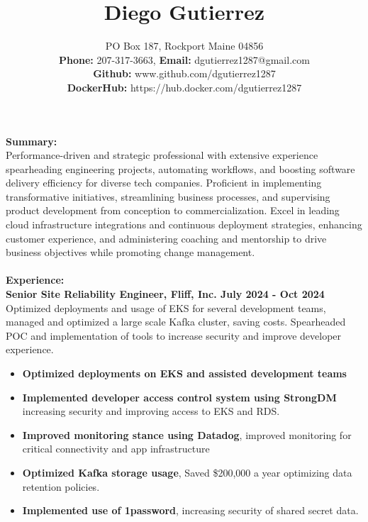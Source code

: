 \documentclass[10pt]{article}
\title{Diego Gutierrez}
\date{}
\author{%
	PO Box 187, Rockport Maine 04856\\
	\textbf{Phone:} 207-317-3663, \textbf{Email:} dgutierrez1287@gmail.com\\
	\textbf{Github:} www.github.com/dgutierrez1287\\
	\textbf{DockerHub:} https://hub.docker.com/dgutierrez1287
}
\makeatletter
\renewcommand{\maketitle}{\bgroup\setlength{\parindent}{0pt}
	\begin{flushleft}
		\LARGE\textbf{\@title}
		
		\normalsize\@author
	\end{flushleft}\egroup
}
\makeatother
\begin{document}
\maketitle
\thispagestyle{empty} %
\noindent\Large\textbf{Summary:}\\
\normalsize Performance-driven and strategic professional with extensive experience spearheading engineering projects, 
automating workflows, and boosting software delivery efficiency for diverse tech companies. Proficient in implementing transformative initiatives, 
streamlining business processes, and supervising product development from conception to commercialization. Excel in leading cloud infrastructure 
integrations and continuous deployment strategies, enhancing customer experience, and administering coaching and mentorship to drive business 
objectives while promoting change management.
\\
\\
\noindent\Large\textbf{Experience:}\\
\normalsize
\textbf{Senior Site Reliability Engineer, Fliff, Inc. \hfill{July 2024 - Oct 2024}}
\normalsize Optimized deployments and usage of EKS for several development teams, managed and optimized a large scale Kafka
cluster, saving costs. Spearheaded POC and implementation of tools to increase security and improve developer experience.
\begin{itemize}
\small
\item \textbf{Optimized deployments on EKS and assisted development teams}
\item \textbf{Implemented developer access control system using StrongDM} increasing security and improving access to EKS and RDS.
\item \textbf{Improved monitoring stance using Datadog}, improved monitoring for critical connectivity and app infrastructure
\item \textbf{Optimized Kafka storage usage}, Saved \$200,000 a year optimizing data retention policies.
\item \textbf{Implemented use of 1password}, increasing security of shared secret data.
\end{itemize}
\end{document}
